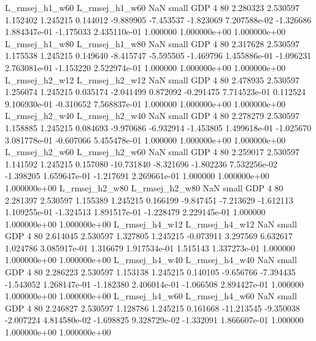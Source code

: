 L_rmsej_h1_w60 L_rmsej_h1_w60                   NaN      small      GDP                 4 80 2.280323       2.530597 1.152402       1.245215    0.144012     -9.889905     -7.453537    -1.823069   7.207588e-02 -1.326686 1.884347e-01    -1.175033   2.435110e-01            1.000000    1.000000e+00        1.000000e+00
L_rmsej_h1_w80 L_rmsej_h1_w80                   NaN      small      GDP                 4 80 2.317628       2.530597 1.175538       1.245215    0.149640     -8.415747     -5.595505    -1.469796   1.455886e-01 -1.096231 2.763081e-01    -1.153220   2.522974e-01            1.000000    1.000000e+00        1.000000e+00
L_rmsej_h2_w12 L_rmsej_h2_w12                   NaN      small      GDP                 4 80 2.478935       2.530597 1.256074       1.245215    0.035174     -2.041499      0.872092    -0.291475   7.714523e-01  0.112524 9.106930e-01    -0.310652   7.568837e-01            1.000000    1.000000e+00        1.000000e+00
L_rmsej_h2_w40 L_rmsej_h2_w40                   NaN      small      GDP                 4 80 2.278279       2.530597 1.158885       1.245215    0.084693     -9.970686     -6.932914    -1.453805   1.499618e-01 -1.025670 3.081778e-01    -0.607066   5.455478e-01            1.000000    1.000000e+00        1.000000e+00
L_rmsej_h2_w60 L_rmsej_h2_w60                   NaN      small      GDP                 4 80 2.259017       2.530597 1.141592       1.245215    0.157080    -10.731840     -8.321696    -1.802236   7.532256e-02 -1.398205 1.659647e-01    -1.217691   2.269661e-01            1.000000    1.000000e+00        1.000000e+00
L_rmsej_h2_w80 L_rmsej_h2_w80                   NaN      small      GDP                 4 80 2.281397       2.530597 1.155389       1.245215    0.166199     -9.847451     -7.213629    -1.612113   1.109255e-01 -1.324513 1.891517e-01    -1.228479   2.229145e-01            1.000000    1.000000e+00        1.000000e+00
L_rmsej_h4_w12 L_rmsej_h4_w12                   NaN      small      GDP                 4 80 2.614045       2.530597 1.327805       1.245215   -0.073911      3.297569      6.632617     1.024786   3.085917e-01  1.316679 1.917534e-01     1.515143   1.337273e-01            1.000000    1.000000e+00        1.000000e+00
L_rmsej_h4_w40 L_rmsej_h4_w40                   NaN      small      GDP                 4 80 2.286223       2.530597 1.153138       1.245215    0.140105     -9.656766     -7.394435    -1.543052   1.268147e-01 -1.182380 2.406014e-01    -1.066508   2.894427e-01            1.000000    1.000000e+00        1.000000e+00
L_rmsej_h4_w60 L_rmsej_h4_w60                   NaN      small      GDP                 4 80 2.246827       2.530597 1.128786       1.245215    0.161668    -11.213545     -9.350038    -2.007224   4.814580e-02 -1.698825 9.328729e-02    -1.332091   1.866607e-01            1.000000    1.000000e+00        1.000000e+00
